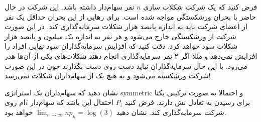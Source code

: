 فرض کنید که یک شرکت شکلات سازی
$n$
نفر سهام‌دار داشته باشد. این شرکت در حال حاضر با بحران ورشکستگی مواجه شده است. برای رهایی از این بحران حداقل یک نفر از اعضای شرکت باید به اندازه پانصد هزار شکلات سرمایه‌گذاری کند. در این صورت شرکت از ورشکستگی خارج می‌شود و هر نفر به اندازه یک میلیون و پانصد هزار شکلات سود خواهد کرد. دقت کنید که افزایش سرمایه‌گذاران سود نهایی افراد را افزایش نمی‌دهد و مثلا اگر ۲ نفر سرمایه‌گذاری انجام دهند شکلات‌های یکی از آن‌ها هدر می‌رود. با این حال سرمایه‌گذاران نباید دست روی دست بگذارند چون در این صورت شرکت ورشکسته می‌شود و به هیچ یک از سهام‌داران شکلات نمی‌رسد!
\vspace{2pt}

نشان دهید که سهام‌داران یک استراتژی
symmetric
و احتمالا به صورت ترکیبی یکتا برای رسیدن به تعادل نش دارند. فرض کنید
$P_i$
احتمال این باشد که سهام‌دار
$i$ام
روی شرکت سرمایه‌گذاری کند. نشان دهید
$\lim_{n \to \infty} n p_n = \log(3)$
خواهد بود.